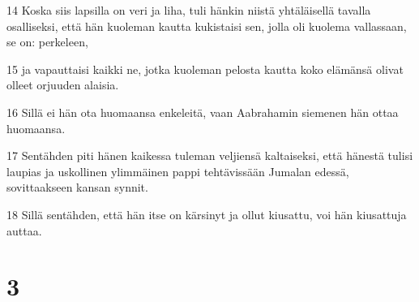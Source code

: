 \par 14 Koska siis lapsilla on veri ja liha, tuli hänkin niistä yhtäläisellä tavalla osalliseksi, että hän kuoleman kautta kukistaisi sen, jolla oli kuolema vallassaan, se on: perkeleen,
\par 15 ja vapauttaisi kaikki ne, jotka kuoleman pelosta kautta koko elämänsä olivat olleet orjuuden alaisia.
\par 16 Sillä ei hän ota huomaansa enkeleitä, vaan Aabrahamin siemenen hän ottaa huomaansa.
\par 17 Sentähden piti hänen kaikessa tuleman veljiensä kaltaiseksi, että hänestä tulisi laupias ja uskollinen ylimmäinen pappi tehtävissään Jumalan edessä, sovittaakseen kansan synnit.
\par 18 Sillä sentähden, että hän itse on kärsinyt ja ollut kiusattu, voi hän kiusattuja auttaa.

\chapter{3}

